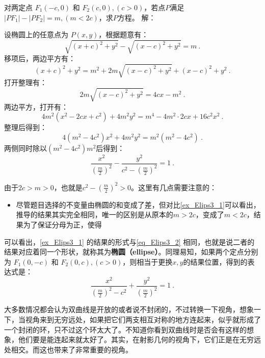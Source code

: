 \begin{example}{对两定点 $F_1(-c, 0)$ 和 $F_2(c, 0),(c>0)$，若点$P$满足$|PF_1| - |PF_2| = m,(m <2c)$，求$P$方程。}
解：

设椭圆上的任意点为 $P(x, y)$，根据题意有：
\begin{equation}
\sqrt{(x + c)^2 + y^2} - \sqrt{(x - c)^2 + y^2} = m~.
\end{equation}
移项后，两边平方有：
\begin{equation}
(x + c)^2 + y^2 = m^2 + 2m\sqrt{(x - c)^2 + y^2} + (x - c)^2 + y^2~.
\end{equation}
打开整理有：
\begin{equation}
2m\sqrt{(x - c)^2 + y^2}= 4cx - m^2~.
\end{equation}
两边平方，打开有：
\begin{equation}
4m^2(x^2 - 2cx+c^2) + 4m^2y^2= m^4-4m^2\cdot2cx+16c^2x^2~.
\end{equation}
整理后得到：
\begin{equation}
4(m^2 -4c^2)x^2 + 4m^2y^2= m^2(m^2-4c^2)~.
\end{equation}
两侧同时除以$(m^2-4c^2)m^2$后得到：
\begin{equation}
\frac{x^2}{\left(\displaystyle\frac{m}{2}\right)^2} -\frac{y^2}{\displaystyle c^2-\left(\frac{m}{2}\right)^2}=1~.
\end{equation}
\end{example}

由于$2c>m>0$，也就是$\displaystyle c^2-\left(\frac{m}{2}\right)^2>0$。这里有几点需要注意的：
\begin{itemize}
\item 尽管题目选择的不变量由椭圆的和变成了差，但对比\autoref{ex_Elips3_1}可以看出，推导的结果其实完全相同，唯一的区别是从原本的$m>2c$，变成了$m<2c$，结果为了保证分母为正，使得
\end{itemize}

可以看出，\autoref{ex_Elips3_1} 的结果的形式与\autoref{eq_Elips3_2} 相同，也就是说二者的结果对应着同一个形状，就称其为\textbf{椭圆（ellipse）}。同理易知，如果两个定点分别为 $F_1(0,-c)$ 和 $F_2(0,c),(c>0)$，则相当于更换$x,y$的结果位置，得到的表达式是：
\begin{equation}
\frac{x^2}{\displaystyle\left(\frac{m}{2}\right)^2-c^2}+\frac{y^2}{\left(\displaystyle\frac{m}{2}\right)^2} =1~.
\end{equation}


大多数情况都会认为双曲线是开放的或者说不封闭的，不过转换一下视角，想象一下，当视角来到无穷远处，如果把它们两支相互对称的地方连起来，似乎就形成了一个封闭的环，只不过这个环太大了。不知道你看到双曲线时是否会有这样的想象，他们要是能连起来就太好了。其实，在射影几何的视角下，它们正是在无穷远处相交。而这也带来了非常重要的视角。

